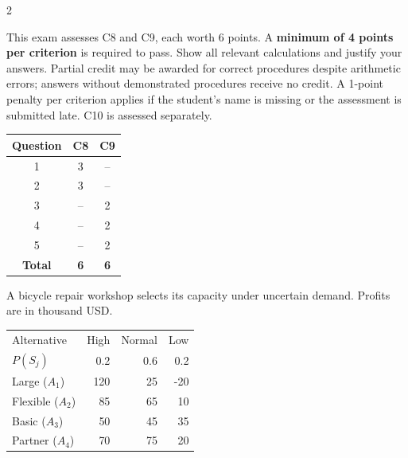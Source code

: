 	\begin{multicols}{2}
		\raggedcolumns
		
		This exam assesses C8 and C9, each worth 6 points. A \textbf{minimum of 4 points per criterion} is required to pass. Show all relevant calculations and justify your answers. Partial credit may be awarded for correct procedures despite arithmetic errors; answers without demonstrated procedures receive no credit. A 1-point penalty per criterion applies if the student's name is missing or the assessment is submitted late. C10 is assessed separately.
		
		\vspace{-3mm}
		\begin{center}
			\begin{tabular}{|c|c|c|}
				\hline
				\textbf{Question} & \textbf{C8} & \textbf{C9} \\ \hline
				1 & 3 & -- \\ \hline
				2 & 3 & -- \\ \hline
				3 & -- & 2 \\ \hline
				4 & -- & 2 \\ \hline
				5 & -- & 2 \\ \hline
				\textbf{Total} & \textbf{6} & \textbf{6} \\ \hline
			\end{tabular}
		\end{center}
		\vspace{-3mm}
		
		A bicycle repair workshop selects its capacity under uncertain demand. Profits are in thousand USD.
		
		\vspace{-3mm}
		\begin{center}\small\setlength{\tabcolsep}{4pt}
			\begin{tabular}{lrrr}\toprule
				Alternative & High & Normal & Low\\
				$P(S_j)$ & 0.2 & 0.6 & 0.2\\ \midrule
				Large ($A_1$) & 120 & 25 & -20\\
				Flexible ($A_2$) & 85 & 65 & 10\\
				Basic ($A_3$) & 50 & 45 & 35\\
				Partner ($A_4$) & 70 & 75 & 20\\
				\bottomrule
			\end{tabular}
		\end{center}
		

\end{multicols}
